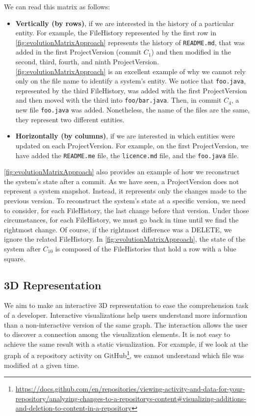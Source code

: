 We can read this matrix as follows:
 \begin{itemize}
     \item \textbf{Vertically (by rows)}, if we are interested in the history of a particular entity. 
     For example, the FileHistory represented by the first row in \autoref{fig:evolutionMatrixApproach} represents the history of \texttt{README.md}, that was added in the first ProjectVersion (commit $C_1$) and then modified in the second, third, fourth, and ninth ProjectVersion.
     \autoref{fig:evolutionMatrixApproach} is an excellent example of why we cannot rely only on the file name to identify a system's entity. 
     We notice that \texttt{foo.java}, represented by the third FileHistory, was added with the first ProjectVersion and then moved with the third into \texttt{foo/bar.java}. 
     Then, in commit $C_4$, a new file \texttt{foo.java} was added. Nonetheless, the name of the files are the same, they represent two different entities. 
     \item \textbf{Horizontally (by columns)}, if we are interested in which entities were updated on each ProjectVersion. 
    For example, on the first ProjectVersion, we have added the \texttt{README.me} file, the \texttt{licence.md} file, and the \texttt{foo.java} file. 
 \end{itemize}

\autoref{fig:evolutionMatrixApproach} also provides an example of how we reconstruct the system's state after a commit. 
As we have seen, a ProjectVersion does not represent a system snapshot.
Instead, it represents only the changes made to the previous version. 
To reconstruct the system's state at a specific version, we need to consider, for each FileHistory, the last change before that version. 
Under those circumstances, for each FileHistory, we must go back in time until we find the rightmost change. Of course, if the rightmost difference was a DELETE, we ignore the related FileHistory.
In \autoref{fig:evolutionMatrixApproach}, the state of the system after $C_{10}$ is composed of the FileHistories that hold a row with a blue square. 



\subsection{3D Representation}
\label{s:3DRepr}
We aim to make an interactive 3D representation to ease the comprehension task of a developer. Interactive visualizations help users understand more information than a non-interactive version of the same graph. The interaction allows the user to discover a connection among the visualization elements. It is not easy to achieve the same result with a static visualization. For example, if we look at the graph of a repository activity on GitHub\footnote{\url{https://docs.github.com/en/repositories/viewing-activity-and-data-for-your-repository/analyzing-changes-to-a-repositorys-content\#visualizing-additions-and-deletion-to-content-in-a-repository}}, we cannot understand which file was modified at a given time. 


